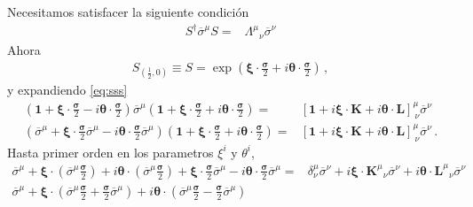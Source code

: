 \begin{frame}
  Necesitamos satisfacer la siguiente condición
\begin{align}
\label{eq:sss}
  S^\dagger\overline{\sigma}^\mu S=&{\Lambda^\mu}_\nu\overline{\sigma}^\nu
\end{align}
Ahora
\begin{align}
\label{eq:SLet}
  S_{\left( \frac{1}{2},0 \right)}\equiv S=
\exp\left( \boldsymbol{\xi}\cdot \frac{\boldsymbol{\sigma}}{2}+i\boldsymbol{\theta}\cdot \frac{\boldsymbol{\sigma}}{2} \right)\,,
\end{align}
y expandiendo \eqref{eq:sss}
\begin{align*}
\left(\mathbf{1}+\boldsymbol{\xi}\cdot \frac{\boldsymbol{\sigma}}{2} -i\boldsymbol{\theta}\cdot \frac{\boldsymbol{\sigma}}{2}  \right)
\overline{\sigma}^{\mu}
\left(\mathbf{1}+\boldsymbol{\xi}\cdot \frac{\boldsymbol{\sigma}}{2} +i\boldsymbol{\theta}\cdot \frac{\boldsymbol{\sigma}}{2}  \right)
=&\left[ \mathbf{1}+i\boldsymbol{\xi}\cdot \mathbf{K}+i\boldsymbol{\theta}\cdot \mathbf{L} \right]^{\mu}_{\ \nu}\overline{\sigma}^\nu \nonumber\\
\left(\overline{\sigma}^{\mu}+\boldsymbol{\xi}\cdot \frac{\boldsymbol{\sigma}}{2}\overline{\sigma}^{\mu} -i\boldsymbol{\theta}\cdot \frac{\boldsymbol{\sigma}}{2}\overline{\sigma}^{\mu}  \right)
\left(\mathbf{1}+\boldsymbol{\xi}\cdot \frac{\boldsymbol{\sigma}}{2} +i\boldsymbol{\theta}\cdot \frac{\boldsymbol{\sigma}}{2}  \right)
=&\left[ \mathbf{1}+i\boldsymbol{\xi}\cdot \mathbf{K}+i\boldsymbol{\theta}\cdot \mathbf{L} \right]^{\mu}_{\ \nu}\overline{\sigma}^\nu \,.
\end{align*}
Hasta primer orden en los parametros $\xi^i$ y $\theta^i$,
\begin{align*}
 \overline{\sigma}^{\mu}+\boldsymbol{\xi}\cdot \left(\overline{\sigma}^{\mu} \frac{\boldsymbol{\sigma}}{2} \right)  +i\boldsymbol{\theta}\cdot \left(\overline{\sigma}^{\mu} \frac{\boldsymbol{\sigma}}{2} \right)+\boldsymbol{\xi}\cdot \frac{\boldsymbol{\sigma}}{2}\overline{\sigma}^{\mu} -i\boldsymbol{\theta}\cdot \frac{\boldsymbol{\sigma}}{2}\overline{\sigma}^{\mu}
 =&\delta^{\mu}_{\nu}\overline{\sigma}^\nu+i\boldsymbol{\xi}\cdot {\mathbf{K}^{\mu}}_{\nu}\overline{\sigma}^\nu+i\boldsymbol{\theta}\cdot {\mathbf{L}^{\mu}}_{\nu}\overline{\sigma}^\nu \nonumber\\
   \overline{\sigma}^{\mu}+\boldsymbol{\xi}\cdot \left(\overline{\sigma}^{\mu}\frac{\boldsymbol{\sigma}}{2}+ \frac{\boldsymbol{\sigma}}{2}\overline{\sigma}^{\mu}\right)  +i\boldsymbol{\theta}\cdot \left(\overline{\sigma}^{\mu} \frac{\boldsymbol{\sigma}}{2}-\frac{\boldsymbol{\sigma}}{2}\overline{\sigma}^{\mu} \right)  

\end{align*}
\end{frame}
